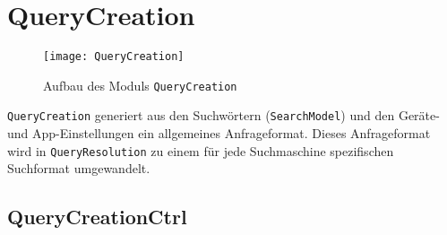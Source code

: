 
\section{QueryCreation}

\begin{figure}[htb]
   \centering
  	\texttt{[image: QueryCreation]}
  	\caption{Aufbau des Moduls \lstinline|QueryCreation|}
\end{figure}
\lstinline|QueryCreation| generiert aus den Suchwörtern (\lstinline|SearchModel|) und den Geräte- und App-Einstellungen ein allgemeines Anfrageformat. Dieses Anfrageformat wird in \lstinline|QueryResolution| zu einem für jede Suchmaschine spezifischen Suchformat umgewandelt.

\subsection{QueryCreationCtrl}

